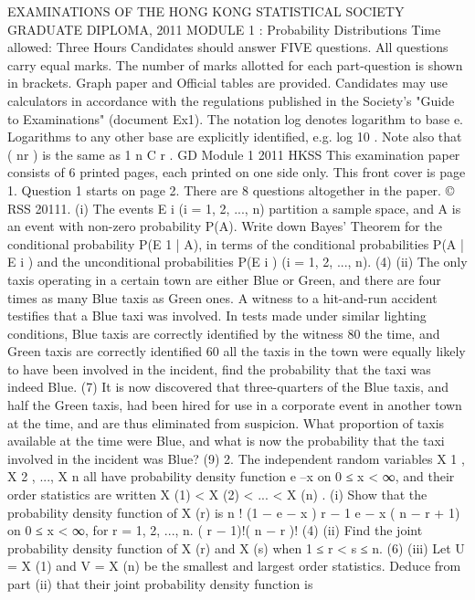 EXAMINATIONS OF THE HONG KONG STATISTICAL SOCIETY
GRADUATE DIPLOMA, 2011
MODULE 1 : Probability Distributions
Time allowed: Three Hours
Candidates should answer FIVE questions.
All questions carry equal marks.
The number of marks allotted for each part-question is shown in brackets.
Graph paper and Official tables are provided.
Candidates may use calculators in accordance with the regulations published in
the Society's "Guide to Examinations" (document Ex1).
The notation log denotes logarithm to base e.
Logarithms to any other base are explicitly identified, e.g. log 10 .
Note also that
( nr ) is the same as
1
n
C r .
GD Module 1 2011 HKSS
This examination paper consists of 6 printed pages, each printed on one side only.
This front cover is page 1.
Question 1 starts on page 2.
There are 8 questions altogether in the paper.
© RSS 20111.
(i) The events {E i } (i = 1, 2, ..., n) partition a sample space, and A is an event with
non-zero probability P(A). Write down Bayes' Theorem for the conditional
probability P(E 1 | A), in terms of the conditional probabilities {P(A | E i )} and
the unconditional probabilities {P(E i )} (i = 1, 2, ..., n).
(4)
(ii) The only taxis operating in a certain town are either Blue or Green, and there
are four times as many Blue taxis as Green ones. A witness to a hit-and-run
accident testifies that a Blue taxi was involved. In tests made under similar
lighting conditions, Blue taxis are correctly identified by the witness 80%
the time, and Green taxis are correctly identified 60%
all the taxis in the town were equally likely to have been involved in the
incident, find the probability that the taxi was indeed Blue.
(7)
It is now discovered that three-quarters of the Blue taxis, and half the Green
taxis, had been hired for use in a corporate event in another town at the time,
and are thus eliminated from suspicion. What proportion of taxis available at
the time were Blue, and what is now the probability that the taxi involved in
the incident was Blue?
(9)
2.
The independent random variables X 1 , X 2 , ..., X n all have probability density function
e –x on 0 ≤ x < ∞, and their order statistics are written X (1) < X (2) < ... < X (n) .
(i)
Show that the probability density function of X (r) is
n !
(1 − e − x ) r − 1 e − x ( n − r + 1) on 0 ≤ x < ∞, for r = 1, 2, ..., n.
( r − 1)!( n − r )!
(4)
(ii)
Find the joint probability density function of X (r) and X (s) when 1 ≤ r < s ≤ n.
(6)
(iii)
Let U = X (1) and V = X (n) be the smallest and largest order statistics. Deduce
from part (ii) that their joint probability density function is
